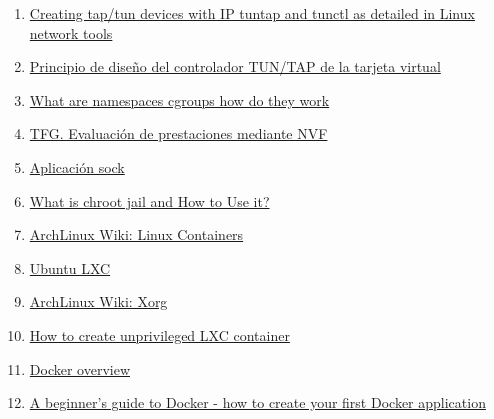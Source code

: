 \documentclass[a4paper, oneside, 12pt]{book}
\begin{document}
\begin{enumerate}
		\item
		\label{bib: tunctl + ip}
		\href{https://developpaper.com/creating-tap-tun-devices-with-ip-tuntap-and-tunctl-as-detailed-in-linux-network-tools/}{Creating tap/tun devices with IP tuntap and tunctl as detailed in Linux network tools}
		
		\item
		\label{bib: code tuntap.c}
		\href{https://programmerclick.com/article/45831226469/}{Principio de diseño del controlador TUN/TAP de la tarjeta virtual}
		
		\item
		\label{bib: cgroups}
		\href{https://www.nginx.com/blog/what-are-namespaces-cgroups-how-do-they-work/}{What are namespaces cgroups how do they work}
		
		\item
		\label{bib: virt ligera}
		\href{https://upcommons.upc.edu/handle/2117/78028?show=full}{TFG. Evaluación de prestaciones mediante NVF}
		
		\item
		\label{bib: sock}
		\href{http://www.icir.org/christian/sock.html}{Aplicación sock}
		
		\item
		\label{bib: chroot jail}
		\href{https://phoenixnap.com/kb/chroot-jail}{What is chroot jail and How to Use it?}
		
		\item
		\label{bib: LXC arch}
		\href{https://wiki.archlinux.org/title/Linux_Containers}{ArchLinux Wiki: Linux Containers}
		
		\item
		\label{bib: crear LXC}
		\href{https://ubuntu.com/server/docs/containers-lxc}{Ubuntu LXC}
		
		\item
		\label{bib: xorg arch wiki}
		\href{https://wiki.archlinux.org/title/xorg}{ArchLinux Wiki: Xorg}
		
		\item
		\label{bib: unprivileged LXC}
		\href{https://www.cyberciti.biz/faq/how-to-create-unprivileged-linux-containers-on-ubuntu-linux/}{How to create unprivileged LXC container}
		
		
		\item
		\label{bib: docker info}
		\href{https://docs.docker.com/get-started/overview/}{Docker overview}
		
		\item
		\label{bib: docker dockerfile}
		\href{https://www.freecodecamp.org/news/a-beginners-guide-to-docker-how-to-create-your-first-docker-application-cc03de9b639f/}{A beginner's guide to Docker - how to create your first Docker application}
		

\end{enumerate}
\end{document}
